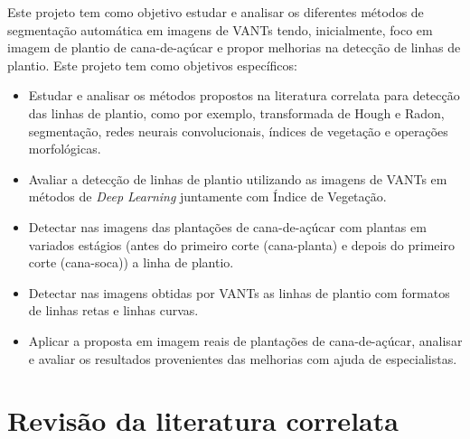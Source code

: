 \documentclass[12pt, a4paper, english, brazil]{article}
\begin{document}
Este projeto tem como objetivo estudar e analisar os diferentes métodos de segmentação automática em imagens de VANTs tendo, inicialmente, foco em imagem de plantio de cana-de-açúcar e propor melhorias na detecção de linhas de plantio. 
Este projeto tem como objetivos específicos:
\begin{itemize}
    \item Estudar e analisar os métodos propostos na literatura correlata para detecção das linhas de plantio, como por exemplo, transformada de Hough e Radon, segmentação, redes neurais convolucionais, índices de vegetação e operações morfológicas.

    \item Avaliar a detecção de linhas de plantio utilizando as imagens de VANTs em métodos de \textit{Deep Learning} juntamente com Índice de Vegetação.

    \item Detectar nas imagens das plantações de cana-de-açúcar com plantas em variados estágios (antes do primeiro corte (cana-planta) e depois do primeiro corte (cana-soca)) a linha de plantio.

    \item Detectar nas imagens obtidas por VANTs
    as linhas de plantio com formatos de linhas retas e linhas curvas.

    \item Aplicar a proposta em imagem reais de plantações de cana-de-açúcar, analisar e avaliar os resultados provenientes das melhorias com ajuda de especialistas.
\end{itemize}



\section{Revisão da literatura correlata}
\end{document}
